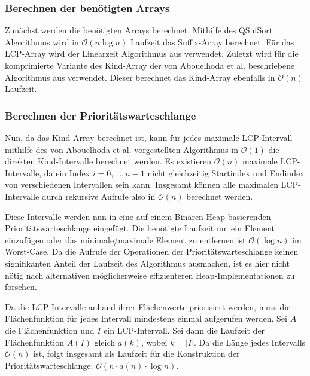 \subsubsection{Berechnen der benötigten Arrays}

Zunächst werden die benötigten Arrays berechnet. Mithilfe des QSufSort Algorithmus \cite{larsson_faster_2007} wird in $\mathcal{O}(n \log n)$ Laufzeit das Suffix-Array berechnet. Für das LCP-Array wird der Linearzeit Algorithmus aus \cite{kasai_linear-time_2001} verwendet. Zuletzt wird für die komprimierte Variante des Kind-Array der von Abouelhoda et al. beschriebene Algorithmus aus \cite{abouelhoda_optimal_2002} verwendet. Dieser berechnet das Kind-Array ebenfalls in $\mathcal{O}(n)$ Laufzeit.

\subsubsection{Berechnen der Prioritätswarteschlange}

Nun, da das Kind-Array berechnet ist, kann für jedes maximale LCP-Intervall mithilfe des von Abouelhoda et al. vorgestellten Algorithmus in $\mathcal{O}(1)$ die direkten Kind-Intervalle berechnet werden. Es existieren $\mathcal{O}(n)$ maximale LCP-Intervalle, da ein Index $i = 0,\dots,n - 1$ nicht gleichzeitig Startindex und Endindex von verschiedenen Intervallen sein kann. Insgesamt können alle maximalen LCP-Intervalle durch rekursive Aufrufe also in $\mathcal{O}(n)$ berechnet werden.

Diese Intervalle werden nun in eine auf einem Binären Heap \cite{williams_algorithm_1964} basierenden Prioritätswarteschlange eingefügt. Die benötigte Laufzeit um ein Element einzufügen oder das minimale/maximale Element zu entfernen ist $\mathcal{O}(\log n)$ im Worst-Case. Da die Aufrufe der Operationen der Prioritätswarteschlange keinen signifikanten Anteil der Laufzeit des Algorithmus ausmachen, ist es hier nicht nötig nach alternativen möglicherweise effizienteren Heap-Implementationen zu forschen.

Da die LCP-Intervalle anhand ihrer Flächenwerte priorisiert werden, muss die Flächenfunktion für jedes Intervall mindestens einmal aufgerufen werden. Sei $A$ die Flächenfunktion und $I$ ein LCP-Intervall. Sei dann die Laufzeit der Flächenfunktion $A(I)$ gleich $a(k)$, wobei $k = |I|$. 
Da die Länge jedes Intervalls $\mathcal{O}(n)$ ist, folgt insgesamt als Laufzeit für die Konstruktion der Prioritätswarteschlange: $\mathcal{O}(n \cdot a(n) \cdot \log n)$.\\\\

